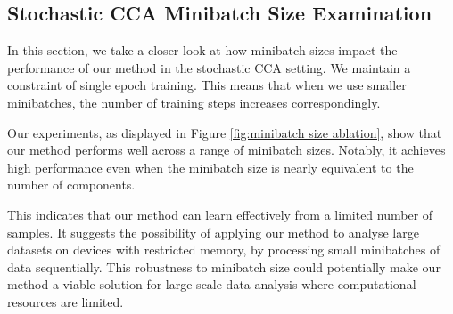 \subsection{Stochastic CCA Minibatch Size Examination}

In this section, we take a closer look at how minibatch sizes impact the performance of our method in the stochastic CCA setting. We maintain a constraint of single epoch training. This means that when we use smaller minibatches, the number of training steps increases correspondingly.

Our experiments, as displayed in Figure \ref{fig:minibatch size ablation}, show that our method performs well across a range of minibatch sizes. Notably, it achieves high performance even when the minibatch size is nearly equivalent to the number of components.

This indicates that our method can learn effectively from a limited number of samples. It suggests the possibility of applying our method to analyse large datasets on devices with restricted memory, by processing small minibatches of data sequentially. This robustness to minibatch size could potentially make our method a viable solution for large-scale data analysis where computational resources are limited.

